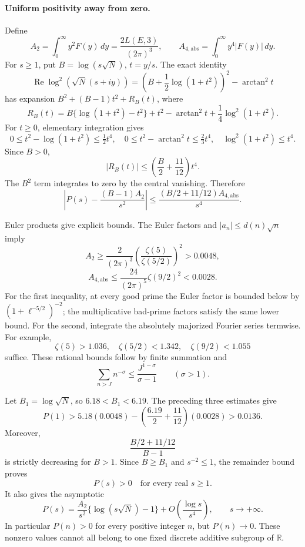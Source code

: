 \documentclass[11pt]{article}
\begin{document}
\paragraph{Uniform positivity away from zero.}
Define
\[
 A_2=\int_0^\infty y^2F(y)\,dy
     =\frac{2L(E,3)}{(2\pi)^3},
 \qquad
 A_{4,\mathrm{abs}}=\int_0^\infty y^4|F(y)|\,dy.
\]
For \(s\ge1\), put \(B=\log(s\sqrt N)\), \(t=y/s\).
The exact identity
\[
 \operatorname{Re}\log^2(\sqrt N(s+iy))
 =\left(B+\frac12\log(1+t^2)\right)^2
       -\arctan^2t
\]
has expansion \(B^2+(B-1)t^2+R_B(t)\), where
\[
 R_B(t)=B\{\log(1+t^2)-t^2\}
       +t^2-\arctan^2t
       +\frac14\log^2(1+t^2).
\]
For \(t\ge0\), elementary integration gives
\[
 0\le t^2-\log(1+t^2)\le\tfrac12t^4,
 \quad
 0\le t^2-\arctan^2t\le\tfrac23t^4,
 \quad
 \log^2(1+t^2)\le t^4.
\]
Since \(B>0\),
\[
 |R_B(t)|\le
 \left(\frac B2+\frac{11}{12}\right)t^4.
\]
The \(B^2\) term integrates to zero by the central vanishing. Therefore
\[
 \boxed{\displaystyle
 \left|P(s)-\frac{(B-1)A_2}{s^2}\right|
 \le\frac{(B/2+11/12)A_{4,\mathrm{abs}}}{s^4}.}
\]

Euler products give explicit bounds. The Euler factors and
\(|a_n|\le d(n)\sqrt n\) imply
\[
 A_2\ge\frac{2}{(2\pi)^3}
       \left(\frac{\zeta(5)}{\zeta(5/2)}\right)^2
       >0.0048,
\]
\[
 A_{4,\mathrm{abs}}
 \le\frac{24}{(2\pi)^5}\zeta(9/2)^2
       <0.0028.
\]
For the first inequality, at every good prime the Euler
factor is bounded below by
\((1+\ell^{-5/2})^{-2}\); the multiplicative bad-prime
factors satisfy the same lower bound. For the second,
integrate the absolutely majorized Fourier series termwise.
For example,
\[
 \zeta(5)>1.036,\quad
 \zeta(5/2)<1.342,\quad
 \zeta(9/2)<1.055
\]
suffice. These rational bounds follow by finite summation and
\[
 \sum_{n>J}n^{-\sigma}
 \le \frac{J^{1-\sigma}}{\sigma-1}
 \qquad(\sigma>1).
\]

Let \(B_1=\log\sqrt N\), so \(6.18<B_1<6.19\).
The preceding three estimates give
\[
 P(1)>
 5.18(0.0048)
 -\left(\frac{6.19}{2}+\frac{11}{12}\right)(0.0028)
 >0.0136.
\]
Moreover,
\[
 \frac{B/2+11/12}{B-1}
\]
is strictly decreasing for \(B>1\).
Since \(B\ge B_1\) and \(s^{-2}\le1\), the remainder bound proves
\[
 \boxed{P(s)>0\quad\text{for every real }s\ge1.}
\]
It also gives the asymptotic
\[
 P(s)=\frac{A_2}{s^2}
       \{\log(s\sqrt N)-1\}
       +O\left(\frac{\log s}{s^4}\right),
 \qquad s\longrightarrow+\infty.
\]
In particular \(P(n)>0\) for every positive integer \(n\),
but \(P(n)\to0\). These nonzero values cannot all belong
to one fixed discrete additive subgroup of \(\mathbb R\).
\end{document}
